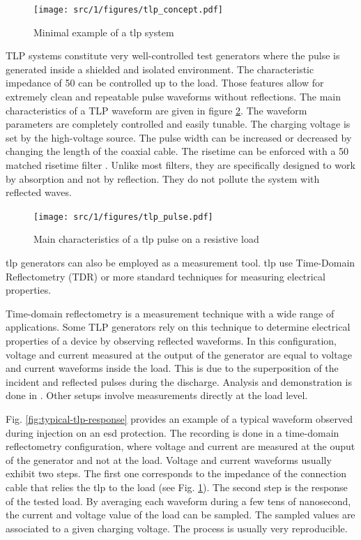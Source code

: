 \begin{figure}[!h]
  \centering
  \texttt{[image: src/1/figures/tlp\_concept.pdf]}
  \caption{Minimal example of a \gls{tlp} system}
  \label{tlp_concept}
\end{figure}

TLP systems constitute very well-controlled test generators where the pulse is generated inside a shielded and isolated environment.
The characteristic impedance of 50\textOmega{} can be controlled up to the load.
Those features allow for extremely clean and repeatable pulse waveforms without reflections.
The main characteristics of a TLP waveform are given in figure \ref{tlp_pulse}.
The waveform parameters are completely controlled and easily tunable.
The charging voltage is set by the high-voltage source.
The pulse width can be increased or decreased by changing the length of the coaxial cable.
The risetime can be enforced with a 50\textOmega{} matched risetime filter \cite{cao-risetime-filter, gaussian-lpf}.
Unlike most filters, they are specifically designed to work by absorption and not by reflection.
They do not pollute the system with reflected waves.

\begin{figure}[!h]
  \centering
  \texttt{[image: src/1/figures/tlp\_pulse.pdf]}
  \caption{Main characteristics of a \gls{tlp} pulse on a resistive load}
  \label{tlp_pulse}
\end{figure}

\gls{tlp} generators can also be employed as a measurement tool.
\gls{tlp} use Time-Domain Reflectometry (TDR) or more standard techniques for measuring electrical properties.

Time-domain reflectometry is a measurement technique with a wide range of applications.
Some TLP generators rely on this technique to determine electrical properties of a device by observing reflected waveforms.
In this configuration, voltage and current measured at the output of the generator are equal to voltage and current waveforms inside the load.
This is due to the superposition of the incident and reflected pulses during the discharge.
Analysis and demonstration is done in \cite{phd-monnereau}.
Other setups involve measurements directly at the load level.

Fig. \ref{fig:typical-tlp-response} provides an example of a typical waveform observed during injection on an \gls{esd} protection.
The recording is done in a time-domain reflectometry configuration, where voltage and current are measured at the ouput of the generator and not at the load.
Voltage and current waveforms usually exhibit two steps.
The first one corresponds to the impedance of the connection cable that relies the \gls{tlp} to the load (see Fig. \ref{tlp_concept}).
The second step is the response of the tested load.
By averaging each waveform during a few tens of nanosecond, the current and voltage value of the load can be sampled.
The sampled values are associated to a given charging voltage.
The process is usually very reproducible.

